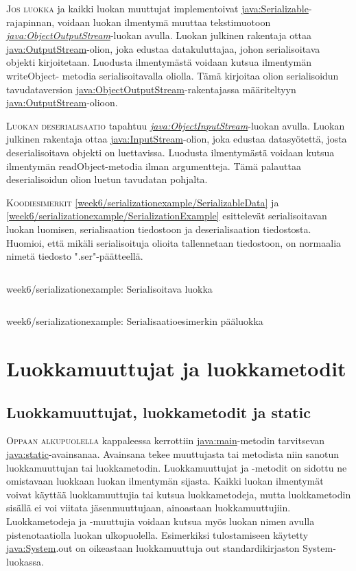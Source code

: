 \documentclass[openany]{book}
\newcommand{\newthought}[1]{\smallskip\textsc{#1}}
\newcommand{\java}[1]{\underline{\gls{java:#1}}}
\newcommand{\newjava}[1]{\textit{\java{#1}}}
\newcommand{\code}[3]{
	\begin{listing}
		\linespread{0.85}
		\inputminted{java}{OhjelmointiopasEsimerkit/src/#1/#2.java}
		\caption{#1: #3}
		\label{#1/#2}
	\end{listing}
}
\begin{document}
\newthought{Jos luokka} ja kaikki luokan muuttujat implementoivat \java{Serializable}-rajapinnan,
voidaan luokan ilmentymä muuttaa tekstimuotoon \newjava{ObjectOutputStream}-luokan avulla.
Luokan julkinen rakentaja ottaa \java{OutputStream}-olion, joka edustaa datakuluttajaa, johon
serialisoitava objekti kirjoitetaan. Luodusta ilmentymästä voidaan kutsua ilmentymän writeObject-
metodia serialisoitavalla oliolla. Tämä kirjoitaa olion serialisoidun tavudataversion
\java{ObjectOutputStream}-rakentajassa määriteltyyn \java{OutputStream}-olioon.

\newthought{Luokan deserialisaatio} tapahtuu \newjava{ObjectInputStream}-luokan avulla. Luokan
julkinen rakentaja ottaa \java{InputStream}-olion, joka edustaa datasyötettä, josta
deserialisoitava objekti on luettavissa. Luodusta ilmentymästä voidaan kutsua ilmentymän
readObject-metodia ilman argumentteja. Tämä palauttaa deserialisoidun olion luetun tavudatan
pohjalta.

\newthought{Koodiesimerkit} \ref{week6/serializationexample/SerializableData} ja
\ref{week6/serializationexample/SerializationExample} esittelevät serialisoitavan luokan luomisen,
serialisaation tiedostoon ja deserialisaation tiedostosta. Huomioi, että mikäli serialisoituja
olioita tallennetaan tiedostoon, on normaalia nimetä tiedosto ".ser"-päätteellä.

\code{week6/serializationexample}{SerializableData}{Serialisoitava luokka}
\code{week6/serializationexample}{SerializationExample}{Serialisaatioesimerkin pääluokka}


\chapter{Luokkamuuttujat ja luokkametodit}
\label{staticsingleton}

\section{Luokkamuuttujat, luokkametodit ja static}
\label{static}

\newthought{Oppaan alkupuolella} kappaleessa  kerrottiin \java{main}-metodin
tarvitsevan \java{static}-avainsanaa. Avainsana tekee muuttujasta tai metodista niin sanotun
luokkamuuttujan tai luokkametodin. Luokkamuuttujat ja -metodit on sidottu ne omistavaan luokkaan
luokan ilmentymän sijasta. Kaikki luokan ilmentymät voivat käyttää luokkamuuttujia tai kutsua
luokkametodeja, mutta luokkametodin sisällä ei voi viitata jäsenmuuttujaan, ainoastaan
luokkamuuttujiin. Luokkametodeja ja -muuttujia voidaan kutsua myös luokan nimen avulla
pistenotaatiolla luokan ulkopuolella. Esimerkiksi tulostamiseen käytetty \java{System}.out on
oikeastaan luokkamuuttuja out standardikirjaston System-luokassa.
\end{document}
